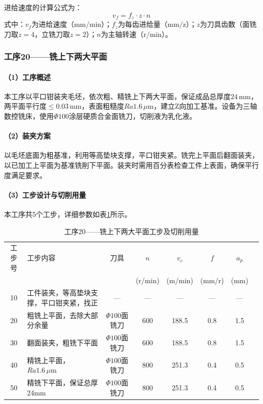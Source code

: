 \documentclass{xautCADreport}
\begin{document}
进给速度的计算公式为：
\begin{equation}
  v_f = f_z \cdot z \cdot n
  \label{eq:vf}
\end{equation}
\noindent 式中：$v_f$为进给速度（mm/min）；$f_z$为每齿进给量（mm/z）；$z$为刀具齿数（面铣刀取$z=4$，立铣刀取$z=2$）；$n$为主轴转速（r/min）。

\subsubsection{工序20——铣上下两大平面}

\paragraph{（1）工序概述}

本工序以平口钳装夹毛坯，依次粗、精铣上下两大平面，保证成品总厚度$24\,\mathrm{mm}$，两平面平行度$\leq0.03\,\mathrm{mm}$，表面粗糙度$Ra1.6\,\mu\mathrm{m}$，建立Z向加工基准。设备为三轴数控铣床，使用$\Phi100$涂层硬质合金面铣刀，切削液为乳化液。

\paragraph{（2）装夹方案}

以毛坯底面为粗基准，利用等高垫块支撑，平口钳夹紧。铣完上平面后翻面装夹，以已加工上平面为基准铣削下平面。装夹时需用百分表检查工件上表面，确保平行度满足要求。

\paragraph{（3）工步设计与切削用量}

本工序共5个工步，详细参数如表\ref{tab:op20_punch}所示。

\begin{table}[H]
  \centering
  \caption{工序20——铣上下两大平面工步及切削用量}
  \label{tab:op20_punch}
  \small
  \setlength{\tabcolsep}{5pt}
  \begin{tabular}{cp{4cm}cccccc}
    \toprule
    工步号 & 工步内容 & 刀具 & \multicolumn{1}{c}{$n$} & \multicolumn{1}{c}{$v_c$} & \multicolumn{1}{c}{$f$} & \multicolumn{1}{c}{$a_p$} \\
    & & & (r/min) & (m/min) & (mm/r) & (mm) \\
    \midrule
    10 & 工件装夹，等高垫块支撑，平口钳夹紧，找正 & — & — & — & — & — \\
    20 & 粗铣上平面，去除大部分余量 & $\Phi100$面铣刀 & 600 & 188.5 & 0.8 & 1.5 \\
    30 & 翻面装夹，粗铣下平面 & $\Phi100$面铣刀 & 600 & 188.5 & 0.8 & 1.5 \\
    40 & 精铣上平面，$Ra1.6\,\mu\mathrm{m}$ & $\Phi100$面铣刀 & 800 & 251.3 & 0.4 & 0.5 \\
    50 & 精铣下平面，保证总厚24mm & $\Phi100$面铣刀 & 800 & 251.3 & 0.4 & 0.5 \\
    \bottomrule
  \end{tabular}
\end{table}
\end{document}
